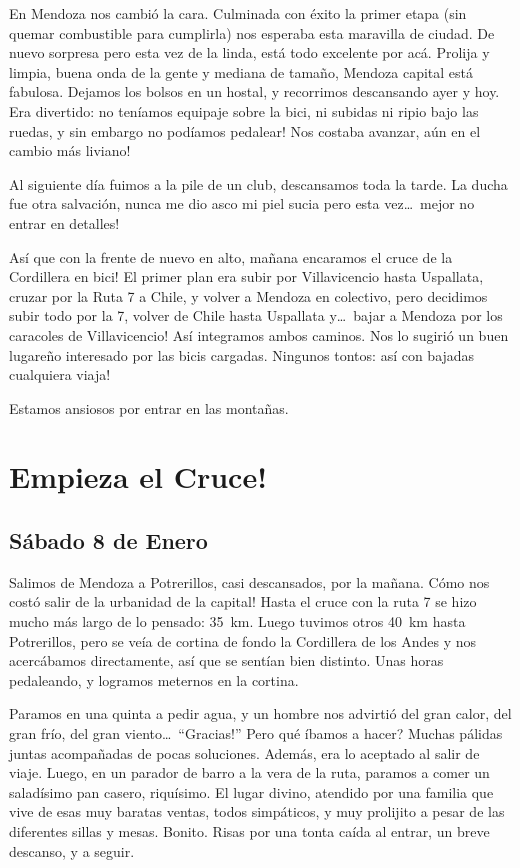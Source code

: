 En Mendoza nos cambi\'o la cara. Culminada con \'exito la primer etapa (sin
quemar combustible para cumplirla) nos esperaba esta maravilla de ciudad. De
nuevo sorpresa pero esta vez de la linda, est\'a todo excelente por ac\'a.
Prolija y limpia, buena onda de la gente y mediana de tama\~no, Mendoza capital
est\'a fabulosa. Dejamos los bolsos en un hostal, y recorrimos descansando ayer
y hoy. Era divertido: no ten\'iamos equipaje sobre la bici, ni subidas ni ripio
bajo las ruedas, \textexclamdown y sin embargo no pod\'iamos pedalear!
\textexclamdown Nos costaba avanzar, a\'un en el cambio m\'as liviano!

Al siguiente d\'ia fuimos a la pile de un club, descansamos toda la tarde. La
ducha fue otra salvaci\'on, nunca me dio asco mi piel sucia pero esta vez\ldots\
\textexclamdown mejor no entrar en detalles!

\textexclamdown As\'i que con la frente de nuevo en alto, ma\~nana encaramos el
cruce de la Cordillera en bici! El primer plan era subir por Villavicencio hasta
Uspallata, cruzar por la Ruta 7 a Chile, y volver a Mendoza en colectivo, pero
decidimos subir todo por la 7, volver de Chile hasta Uspallata y\ldots\
\textexclamdown bajar a Mendoza por los caracoles de Villavicencio! As\'i
integramos ambos caminos. Nos lo sugiri\'o un buen lugare\~no interesado por
las bicis cargadas. Ningunos tontos: \textexclamdown as\'i con bajadas
cualquiera viaja!

Estamos ansiosos por entrar en las monta\~nas.

\section{\textexclamdown Empieza el Cruce!}

\subsection*{S\'abado 8 de Enero}

Salimos de Mendoza a Potrerillos, casi descansados, por la ma\~nana.
\textexclamdown C\'omo nos cost\'o salir de la urbanidad de la capital! Hasta el
cruce con la ruta 7 se hizo mucho m\'as largo de lo pensado: 35~km. Luego
tuvimos otros 40~km hasta Potrerillos, pero se ve\'ia de cortina de fondo la
Cordillera de los Andes y nos acerc\'abamos directamente, as\'i que se sent\'ian
bien distinto. Unas horas pedaleando, y logramos meternos en la cortina.

Paramos en una quinta a pedir agua, y un hombre nos advirti\'o del gran calor,
del gran fr\'io, del gran viento\ldots\ ``\textexclamdown Gracias!''
\textquestiondown Pero qu\'e \'ibamos a hacer? Muchas p\'alidas juntas
acompa\~nadas de pocas soluciones. Adem\'as, era lo aceptado al salir de viaje.
Luego, en un parador de barro a la vera de la ruta, paramos a comer un
salad\'isimo pan casero, riqu\'isimo. El lugar divino, atendido por una familia
que vive de esas muy baratas ventas, todos simp\'aticos, y muy prolijito a pesar
de las diferentes sillas y mesas. Bonito. Risas por una tonta ca\'ida al entrar,
un breve descanso, y a seguir.

